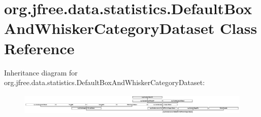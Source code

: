 \hypertarget{classorg_1_1jfree_1_1data_1_1statistics_1_1_default_box_and_whisker_category_dataset}{}\section{org.\+jfree.\+data.\+statistics.\+Default\+Box\+And\+Whisker\+Category\+Dataset Class Reference}
\label{classorg_1_1jfree_1_1data_1_1statistics_1_1_default_box_and_whisker_category_dataset}
Inheritance diagram for org.\+jfree.\+data.\+statistics.\+Default\+Box\+And\+Whisker\+Category\+Dataset\+:\begin{figure}[H]
\begin{center}
\leavevmode
\includegraphics[height=1.066667cm]{classorg_1_1jfree_1_1data_1_1statistics_1_1_default_box_and_whisker_category_dataset}
\end{center}
\end{figure}
